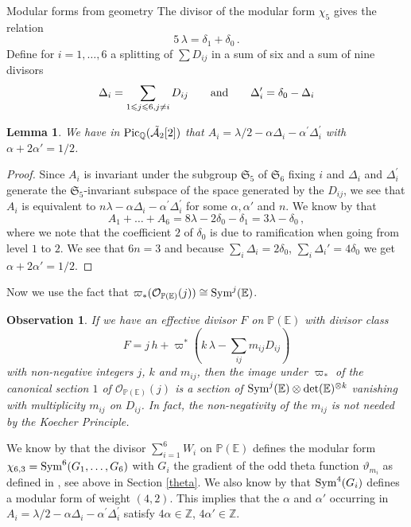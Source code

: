 \documentclass[12pt]{amsart}
\numberwithin{equation}{section}
\newcommand{\EE}{\mathbb E}
\newcommand{\PP}{\mathbb P}
\newcommand{\QQ}{\mathbb Q}
\newcommand{\ZZ}{\mathbb Z}
\def\leq{\leqslant}
\numberwithin{equation}{section}
\newtheorem{observation}[theorem]{Observation}
\newtheorem{lemma}[theorem]{Lemma}
\theoremstyle{definition}
\theoremstyle{remark}
\begin{document}
\begin{section}{Modular forms from geometry}
The divisor of the modular form $\chi_5$
gives the relation
$$
5\, \lambda = \delta_1 +\delta_0\, .
$$
Define for $i=1,\ldots,6$ a splitting of $\sum D_{ij}$ in a sum of six and a sum of nine divisors
$$
\Delta_i= \sum_{1\leq j \leq 6, j\neq i} D_{ij} \qquad \text{\rm and} \qquad  \Delta_i^{\prime}= \delta_0 -\Delta_i
$$


\begin{lemma}
We have in ${\rm Pic}_{\QQ}(\tilde{\mathcal{A}}_2[2])$ that 
$A_i=\lambda/2 - \alpha \Delta_i - \alpha^{\prime} \Delta_i^{\prime}$ with $\alpha+2 \alpha'=1/2$. 
\end{lemma}
\begin{proof}
Since $A_i$ is invariant under the subgroup $\mathfrak{S}_5$ of $\mathfrak{S}_6$ fixing $i$ and $\Delta_i$ and $\Delta_i^{\prime}$
generate the $\mathfrak{S}_5$-invariant subspace of the space generated by the $D_{ij}$, we see that $A_i$ is equivalent to
$n\lambda - \alpha \Delta_i - \alpha^{\prime} \Delta_i^{\prime}$ for some $\alpha,\alpha'$ and $n$. 
We know by \cite[Section 2]{vdG-K} 
that
$$
A_1+\ldots + A_6= 8\lambda -2 \delta_0-\delta_1= 3\lambda-\delta_0\, ,
$$
where we note that the coefficient $2$ of $\delta_0$ is due to ramification when going from level $1$ to $2$.
We see that $6n=3$ and because $\sum_i \Delta_i= 2\delta_0$, $\sum_i \Delta_i'=4\delta_0$ we get $\alpha + 2 \alpha'=1/2$.
\end{proof}
Now we use the fact that 
$\varpi_*(\mathcal{O}_{{\PP}({\EE})}(j))\cong {\rm Sym}^j({\EE})$. 
\begin{observation} \label{opmerking}
If we have an effective divisor $F$
on ${\PP}({\EE})$ with divisor class
\begin{equation}
F= j \, h +\varpi^*(k\, \lambda - \sum_{ij} m_{ij} D_{ij})
\end{equation}
with non-negative integers $j$, $k$ and $m_{ij}$, 
then the image under $\varpi_*$ of the canonical section $1$ of $\mathcal{O}_{\PP({\EE})}(j)$ is a section
of ${\rm Sym}^j({\EE}) \otimes \det({\EE})^{\otimes k}$ vanishing with multiplicity $m_{ij}$ on $D_{ij}$.
In fact, the non-negativity of the $m_{ij}$ is not needed by the Koecher Principle.
\end{observation}
We know by \cite{vdG-K} that the divisor $\sum_{i=1}^6 W_i$ on ${\PP}({\EE})$ defines the modular 
form $\chi_{6,3}={\rm Sym}^6(G_1,\ldots,G_6)$
with $G_i$ the gradient of the odd theta function $\vartheta_{m_i}$ as defined in \cite{CvdGG}, see above in Section \ref{theta}.
We also know by \cite[Prop.\ 23.2]{CvdGG} that ${\rm Sym}^4(G_i)$ defines a modular form of weight $(4,2)$. This implies that the $\alpha$ and $\alpha'$
occurring in 
$A_i=\lambda/2 - \alpha \Delta_i - \alpha^{\prime} \Delta_i^{\prime}$ satisfy $4\alpha \in {\ZZ}$, $4\alpha' \in {\ZZ}$.


\end{section}
\end{document}
